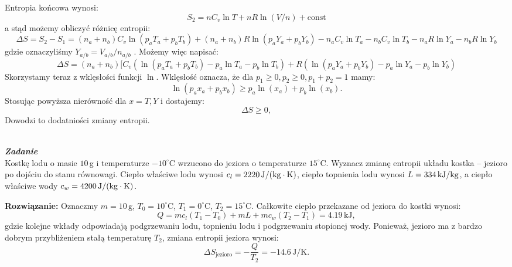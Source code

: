 \documentclass[11pt,a4paper]{article}
\renewcommand{\t}[1]{\textrm{#1}}
\renewcommand{\u}[1]{\,\textrm{#1}}
\newcounter{zadanie}\newcommand{\zadanie}[1][]{\addtocounter{zadanie}{1} ~\\  {\bf \emph{Zadanie \arabic{zadanie} #1 }} \\}
\renewcommand{\t}[1]{\textrm{#1}}
\begin{document}
Entropia końcowa wynosi:
\begin{equation}
S_2 = n C_v \ln T  + n R \ln (V/n)  + \t{const}
\end{equation}
a stąd możemy obliczyć różnicę entropii:
\begin{equation}
\Delta S  =S_2 - S_1 = (n_a + n_b) C_v \ln (p_a T_a + p_b T_b) + (n_a + n_b) R\ln (p_aY_a + p_bY_b) - n_a C_v \ln T_a  -n_b C_v \ln T_b
- n_a R \ln Y_a - n_b R \ln Y_b
\end{equation}
gdzie oznaczyliśmy $Y_{a/b}=V_{a/b}/n_{a/b}$
. Możemy więc napisać:
\begin{equation}
\Delta S   =(n_a + n_b)[ C_v (\ln (p_a T_a + p_b T_b)  - p_a\ln T_a - p_b\ln T_b)+R(\ln (p_a Y_a + p_b Y_b)  - p_a\ln Y_a - p_b\ln Y_b)
\end{equation}
Skorzystamy teraz z wklęsłości funkcji $\ln$. Wklęsłość oznacza, że dla $p_1 \geq 0, p_2 \geq 0, p_1+p_2 =1$ mamy:
\begin{equation}
\ln(p_a x_a + p_b x_b) \geq p_a \ln(x_a) + p_b \ln (x_b).
\end{equation}
Stosując powyższa nierówność dla $x=T,Y$ i  dostajemy:
\begin{equation}
\Delta S  \geq  0,
\end{equation}
Dowodzi to dodatniości zmiany entropii.
\newpage
\zadanie
Kostkę lodu o masie $10\,$g i temperaturze $-10^\circ$C wrzucono do jeziora o
temperaturze $15^\circ$C.
Wyznacz zmianę entropii układu kostka -- jezioro po dojściu do
stanu równowagi. Ciepło właściwe lodu wynosi $c_l = 2220\,{\rm J/(kg\cdot K)}$,
ciepło topnienia lodu wynosi $L = 334\,{\rm kJ/kg}$, a ciepło właściwe
wody $c_w = 4200\,{\rm J/(kg\cdot K)}$.
\newline

\vskip 10pt
\noindent
\textbf{Rozwiązanie:}
Oznaczmy $m=10\u{g}$, $T_0  = 10^\circ\t{C}$, $T_1 = 0^\circ\t{C}$, $T_2 = 15^\circ\t{C}$.
Całkowite ciepło przekazane od jeziora do kostki wynosi:
\begin{equation}
  Q = m c_l (T_1 - T_0) + m L + m c_w (T_2 - T_1)  = 4.19 \u{kJ},
\end{equation}
gdzie kolejne wkłady odpowiadają podgrzewaniu lodu, topnieniu lodu i podgrzewaniu stopionej wody.
Ponieważ, jezioro ma z bardzo dobrym przybliżeniem stałą temperaturę $T_2$, zmiana entropii jeziora wynosi:
\begin{equation}
\Delta S_{\t{jezioro}} = - \frac{Q}{T_2} = - 14.6 \u{J/K}.
\end{equation}
\end{document}
